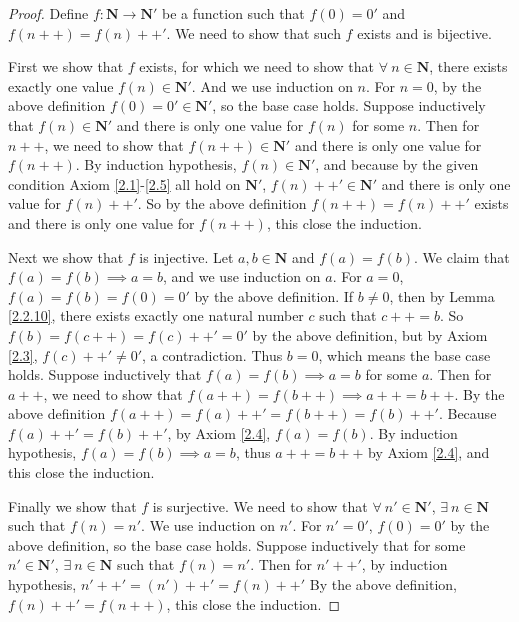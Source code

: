 \begin{proof}
Define \(f : \mathbf{N} \to \mathbf{N}'\) be a function such that \(f(0) = 0'\) and \(f(n++) = f(n)++'\).
We need to show that such \(f\) exists and is bijective.

First we show that \(f\) exists, for which we need to show that \(\forall\ n \in \mathbf{N}\), there exists exactly one value \(f(n) \in \mathbf{N}'\).
And we use induction on \(n\).
For \(n = 0\), by the above definition \(f(0) = 0' \in \mathbf{N}'\), so the base case holds.
Suppose inductively that \(f(n) \in \mathbf{N}'\) and there is only one value for \(f(n)\) for some \(n\).
Then for \(n++\), we need to show that \(f(n++) \in \mathbf{N}'\) and there is only one value for \(f(n++)\).
By induction hypothesis, \(f(n) \in \mathbf{N}'\), and because by the given condition Axiom \ref{2.1}-\ref{2.5} all hold on \(\mathbf{N}'\), \(f(n)++' \in \mathbf{N}'\) and there is only one value for \(f(n)++'\).
So by the above definition \(f(n++) = f(n)++'\) exists and there is only one value for \(f(n++)\), this close the induction.

Next we show that \(f\) is injective.
Let \(a, b \in \mathbf{N}\) and \(f(a) = f(b)\).
We claim that \(f(a) = f(b) \implies a = b\), and we use induction on \(a\).
For \(a = 0\), \(f(a) = f(b) = f(0) = 0'\) by the above definition.
If \(b \neq 0\), then by Lemma \ref{2.2.10}, there exists exactly one natural number \(c\) such that \(c++ = b\).
So \(f(b) = f(c++) = f(c)++' = 0'\) by the above definition, but by Axiom \ref{2.3}, \(f(c)++' \neq 0'\), a contradiction.
Thus \(b = 0\), which means the base case holds.
Suppose inductively that \(f(a) = f(b) \implies a = b\) for some \(a\).
Then for \(a++\), we need to show that \(f(a++) = f(b++) \implies a++ = b++\).
By the above definition \(f(a++) = f(a)++' = f(b++) = f(b)++'\).
Because \(f(a)++' = f(b)++'\), by Axiom \ref{2.4}, \(f(a) = f(b)\).
By induction hypothesis, \(f(a) = f(b) \implies a = b\), thus \(a++ = b++\) by Axiom \ref{2.4}, and this close the induction.

Finally we show that \(f\) is surjective.
We need to show that \(\forall\ n' \in \mathbf{N}'\), \(\exists\ n \in \mathbf{N}\) such that \(f(n) = n'\).
We use induction on \(n'\).
For \(n' = 0'\), \(f(0) = 0'\) by the above definition, so the base case holds.
Suppose inductively that for some \(n' \in \mathbf{N}'\), \(\exists\ n \in \mathbf{N}\) such that \(f(n) = n'\).
Then for \(n'++'\), by induction hypothesis, \(n'++' = (n')++' = f(n)++'\)
By the above definition, \(f(n)++' = f(n++)\), this close the induction.
\end{proof}